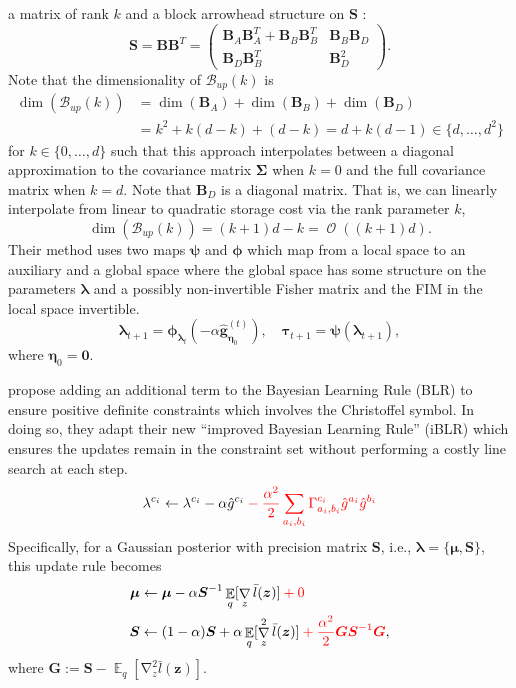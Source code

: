 \documentclass[a4paper, 11pt, oneside]{scrartcl}
\theoremstyle{break}
\DeclareMathOperator{\Expect}{\mathbb{E}}
\DeclareMathOperator{\grad}{\nabla}
\DeclareMathOperator{\BigO}{\mathcal{O}}
\newcommand{\matr}[1]{\boldsymbol{#1}}
\newcommand{\set}[1]{\mathcal{#1}}
\numberwithin{equation}{section}
\begin{document}
				a matrix of rank $k$ and a block arrowhead structure on $\matr{S}$ \parencite{OS90}:
				$$\matr{S} = \matr{B} \matr{B}^T = \begin{pmatrix} \matr{B}_A \matr{B}_A^T + \matr{B}_B \matr{B}_B^T & \matr{B}_B \matr{B}_D \\ \matr{B}_D \matr{B}_B^T & \matr{B}_D^2 \end{pmatrix}.$$
				Note that the dimensionality of $\set{B}_{up}(k)$ is
				\begin{align*}
					\dim(\set{B}_{up}(k)) &= \dim (\matr{B}_A) + \dim (\matr{B}_B) + \dim (\matr{B}_D) \\
					&= k^2 + k (d - k) + (d - k) = d + k (d - 1) \in \{d, \dots, d^2\}
				\end{align*}
				for $k \in \{0, \dots, d\}$ such that this approach interpolates between a diagonal approximation to the covariance matrix $\matr{\Sigma}$ when $k = 0$ and the full covariance matrix when $k = d$.
				Note that $\matr{B}_D$ is a diagonal matrix.
				That is, we can linearly interpolate from linear to quadratic storage cost via the rank parameter $k$,
				\begin{equation*}
					\dim(\set{B}_{up}(k)) = (k + 1) d - k = \BigO ((k + 1) d).
				\end{equation*}
				Their method uses two maps $\matr{\psi}$ and $\matr{\phi}$ which map from a local space to an auxiliary and a global space where the global space has some structure on the parameters $\matr{\lambda}$ and a possibly non-invertible Fisher matrix and the FIM in the local space invertible. 
				$$\matr{\lambda}_{t+1} = \matr{\phi}_{\matr{\lambda}_t}(-\alpha \matr{\hat{g}}_{\matr{\eta}_0}^{(t)}), \quad \matr{\tau}_{t+1} = \matr{\psi} (\matr{\lambda}_{t+1}),$$
				where $\matr{\eta}_0 = \matr{0}$.

				\parencite{LSK20} propose adding an additional term to the Bayesian Learning Rule (BLR) to ensure positive definite constraints which involves the Christoffel symbol. 
				In doing so, they adapt their new ``improved Bayesian Learning Rule'' (iBLR) which ensures the updates remain in the constraint set without performing a costly line search at each step.
				\begin{align*}
					\lambda^{c_i} \leftarrow \lambda^{c_i} - \alpha \hat{g}^{c_i} \color{red} - \frac{\alpha^2}{2} \sum_{a_i, b_i} \Gamma_{a_i, b_i}^{c_i} \hat{g}^{a_i} \hat{g}^{b_i} \color{black}
				\end{align*}
				Specifically, for a Gaussian posterior with precision matrix $\matr{S}$, i.e., $\matr{\lambda} = \{\matr{\mu}, \matr{S}\}$, this update rule becomes
				\begin{align*}
					\matr{\mu} &\leftarrow \matr{\mu} - \alpha \matr{S}^{-1} \Expect_q[\grad_z \bar{l}(\matr{z})] \color{red} + 0 \color{black}\\
					\matr{S} &\leftarrow (1 - \alpha) \matr{S} + \alpha \Expect_q[\grad_z^2 \bar{l}(\matr{z})] \color{red} + \frac{\alpha^2}{2} \matr{G} \matr{S}^{-1} \matr{G} \color{black},
				\end{align*}
				where $\matr{G} := \matr{S} - \Expect_q[\grad_z^2 \bar{l}(\matr{z})]$.
\end{document}
